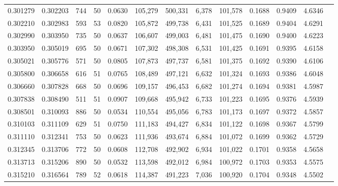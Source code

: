 \begin{tabular}{rrrrrrrrrrrrr}
0.301279 & 0.302203 &   744 &  50 &                                     0.0630 & 105,279 & 500,331 &   6,378 & 101,578 & 0.1688 & 0.9409 & 4.6346 \\
0.302210 & 0.302983 &   593 &  53 &                                     0.0820 & 105,872 & 499,738 &   6,431 & 101,525 & 0.1689 & 0.9404 & 4.6291 \\
0.302990 & 0.303950 &   735 &  50 &                                     0.0637 & 106,607 & 499,003 &   6,481 & 101,475 & 0.1690 & 0.9400 & 4.6223 \\
0.303950 & 0.305019 &   695 &  50 &                                     0.0671 & 107,302 & 498,308 &   6,531 & 101,425 & 0.1691 & 0.9395 & 4.6158 \\
0.305021 & 0.305776 &   571 &  50 &                                     0.0805 & 107,873 & 497,737 &   6,581 & 101,375 & 0.1692 & 0.9390 & 4.6106 \\
0.305800 & 0.306658 &   616 &  51 &                                     0.0765 & 108,489 & 497,121 &   6,632 & 101,324 & 0.1693 & 0.9386 & 4.6048 \\
0.306660 & 0.307828 &   668 &  50 &                                     0.0696 & 109,157 & 496,453 &   6,682 & 101,274 & 0.1694 & 0.9381 & 4.5987 \\
0.307838 & 0.308490 &   511 &  51 &                                     0.0907 & 109,668 & 495,942 &   6,733 & 101,223 & 0.1695 & 0.9376 & 4.5939 \\
0.308501 & 0.310093 &   886 &  50 &                                     0.0534 & 110,554 & 495,056 &   6,783 & 101,173 & 0.1697 & 0.9372 & 4.5857 \\
0.310103 & 0.311109 &   629 &  51 &                                     0.0750 & 111,183 & 494,427 &   6,834 & 101,122 & 0.1698 & 0.9367 & 4.5799 \\
0.311110 & 0.312341 &   753 &  50 &                                     0.0623 & 111,936 & 493,674 &   6,884 & 101,072 & 0.1699 & 0.9362 & 4.5729 \\
0.312345 & 0.313706 &   772 &  50 &                                     0.0608 & 112,708 & 492,902 &   6,934 & 101,022 & 0.1701 & 0.9358 & 4.5658 \\
0.313713 & 0.315206 &   890 &  50 &                                     0.0532 & 113,598 & 492,012 &   6,984 & 100,972 & 0.1703 & 0.9353 & 4.5575 \\
0.315210 & 0.316564 &   789 &  52 &                                     0.0618 & 114,387 & 491,223 &   7,036 & 100,920 & 0.1704 & 0.9348 & 4.5502 \\

\end{tabular}
